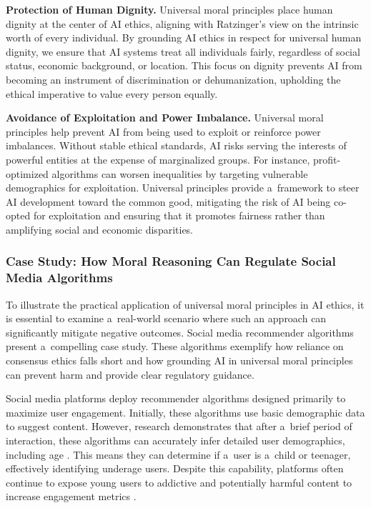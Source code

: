 \documentclass[%
  manuscript=article,
  year=2024,
  volume=77,
  doi=00000.000,
]{zfn}
\begin{document}
\textbf{Protection of Human Dignity.} Universal moral principles place human dignity at the center of AI ethics, aligning with Ratzinger's view on the intrinsic worth of every individual. By grounding AI ethics in respect for universal human dignity, we ensure that AI systems treat all individuals fairly, regardless of social status, economic background, or location. This focus on dignity prevents AI from becoming an instrument of discrimination or dehumanization, upholding the ethical imperative to value every person equally.



\textbf{Avoidance of Exploitation and Power Imbalance.} Universal moral principles help prevent AI from being used to exploit or reinforce power imbalances. Without stable ethical standards, AI risks serving the interests of powerful entities at the expense of marginalized groups. For instance, profit-optimized algorithms can worsen inequalities by targeting vulnerable demographics for exploitation. Universal principles provide a~framework to steer AI development toward the common good, mitigating the risk of AI being co-opted for exploitation and ensuring that it promotes fairness rather than amplifying social and economic disparities.



\subsubsection{Case Study: How Moral Reasoning Can Regulate Social Media Algorithms}



To illustrate the practical application of universal moral principles in AI ethics, it is essential to examine a~real-world scenario where such an approach can significantly mitigate negative outcomes. Social media recommender algorithms present a~compelling case study. These algorithms exemplify how reliance on consensus ethics falls short and how grounding AI in universal moral principles can prevent harm and provide clear regulatory guidance.



Social media platforms deploy recommender algorithms designed primarily to maximize user engagement. Initially, these algorithms use basic demographic data to suggest content. However, research demonstrates that after a~brief period of interaction, these algorithms can accurately infer detailed user demographics, including age 
\parencite[][]{narayanan_understanding_2023}. %
 This means they can determine if a~user is a~child or teenager, effectively identifying underage users. Despite this capability, platforms often continue to expose young users to addictive and potentially harmful content to increase engagement metrics 
\parencite[][]{panoptykon_foundation_fixing_2023}.%
\end{document}
